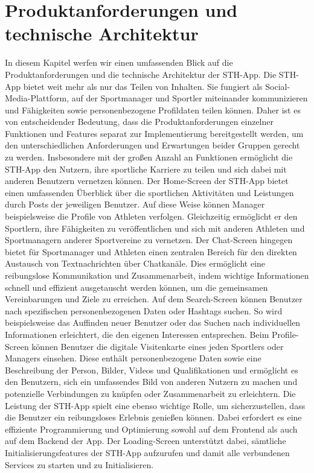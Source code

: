 \newpage
\chapter{Produktanforderungen und technische Architektur}

In diesem Kapitel werfen wir einen umfassenden Blick auf die Produktanforderungen und die technische Architektur der STH-App.
Die STH-App bietet weit mehr als nur das Teilen von Inhalten. Sie fungiert als Social-Media-Plattform, auf der Sportmanager und Sportler miteinander kommunizieren und Fähigkeiten sowie personenbezogene Profildaten teilen können. Daher ist es von entscheidender Bedeutung, dass die Produktanforderungen einzelner Funktionen und Features separat zur Implementierung bereitgestellt werden, um den unterschiedlichen Anforderungen und Erwartungen beider Gruppen gerecht zu werden.
Insbesondere mit der großen Anzahl an Funktionen ermöglicht die STH-App den Nutzern, ihre sportliche Karriere zu teilen und sich dabei mit anderen Benutzern vernetzen können.
Der Home-Screen der STH-App bietet einen umfassenden Überblick über die sportlichen Aktivitäten und Leistungen durch Posts der jeweiligen Benutzer. Auf diese Weise können Manager beispielsweise die Profile von Athleten verfolgen. Gleichzeitig ermöglicht er den Sportlern, ihre Fähigkeiten zu veröffentlichen und sich mit anderen Athleten und Sportmanagern anderer Sportvereine zu vernetzen.
Der Chat-Screen hingegen bietet für Sportmanager und Athleten einen zentralen Bereich für den direkten Austausch von Textnachrichten über Chatkanäle. Dies ermöglicht eine reibungslose Kommunikation und Zusammenarbeit, indem wichtige Informationen schnell und effizient ausgetauscht werden können, um die gemeinsamen Vereinbarungen und Ziele zu erreichen.
Auf dem Search-Screen können Benutzer nach spezifischen personenbezogenen Daten oder Hashtags suchen. So wird beispielsweise das Auffinden neuer Benutzer oder das Suchen nach individuellen Informationen erleichtert, die den eigenen Interessen entsprechen.
Beim Profile-Screen können Benutzer die digitale Visitenkarte eines jeden Sportlers oder Managers einsehen. Diese enthält personenbezogene Daten sowie eine Beschreibung der Person, Bilder, Videos und Qualifikationen und ermöglicht es den Benutzern, sich ein umfassendes Bild von anderen Nutzern zu machen und potenzielle Verbindungen zu knüpfen oder Zusammenarbeit zu erleichtern.
Die Leistung der STH-App spielt eine ebenso wichtige Rolle, um sicherzustellen, dass die Benutzer ein reibungsloses Erlebnis genießen können. Dabei erfordert es eine effiziente Programmierung und Optimierung sowohl auf dem Frontend als auch auf dem Backend der App. Der Loading-Screen unterstützt dabei, sämtliche Initialisierungsfeatures der STH-App aufzurufen und damit alle verbundenen Services zu starten und zu Initialisieren.
